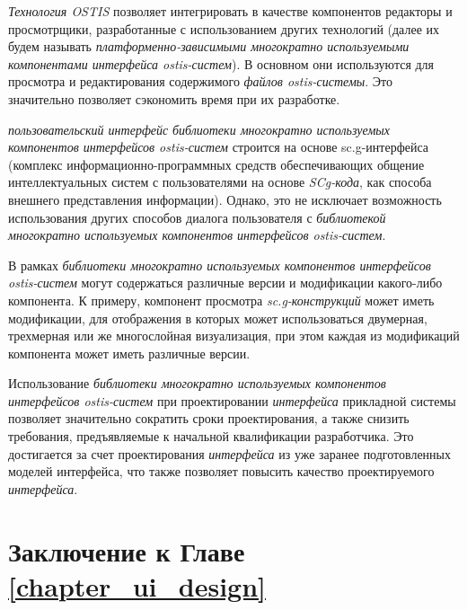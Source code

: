 {\textit{Технология OSTIS} позволяет интегрировать в качестве компонентов редакторы и просмотрщики, разработанные с использованием других технологий (далее их будем называть \textit{платформенно-зависимыми многократно используемыми компонентами интерфейса ostis-систем}). В основном они используются для просмотра и редактирования содержимого \textit{файлов ostis-системы}. Это значительно позволяет сэкономить время при их разработке.

\textit{пользовательский интерфейс} \textit{библиотеки многократно используемых компонентов интерфейсов ostis-систем} строится на основе sc.g-интерфейса (комплекс информационно-программных средств обеспечивающих общение интеллектуальных систем с пользователями на основе \textit{SCg-кода}, как способа внешнего представления информации). Однако, это не исключает возможность использования других способов диалога пользователя с \textit{библиотекой многократно используемых компонентов интерфейсов ostis-систем}.

В рамках \textit{библиотеки многократно используемых компонентов интерфейсов ostis-систем} могут содержаться различные версии и модификации какого-либо компонента. К примеру, компонент просмотра \textit{sc.g-конструкций} может иметь модификации, для отображения в которых может использоваться двумерная, трехмерная или же многослойная визуализация, при этом каждая из модификаций компонента может иметь различные версии.

Использование \textit{библиотеки многократно используемых компонентов интерфейсов ostis-систем} при проектировании \textit{интерфейса} прикладной системы позволяет значительно сократить сроки проектирования, а также снизить требования, предъявляемые к начальной квалификации разработчика. Это достигается за счет проектирования \textit{интерфейса} из уже заранее подготовленных моделей интерфейса, что также позволяет повысить качество проектируемого \textit{интерфейса}.

\section*{Заключение к Главе \ref{chapter_ui_design}}

}
